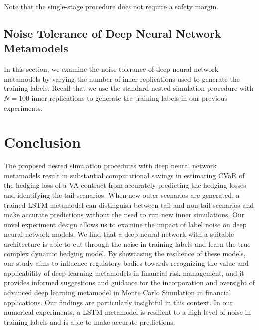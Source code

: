 \documentclass{article}
\begin{document}
Note that the single-stage procedure does not require a safety margin.

\subsection{Noise Tolerance of Deep Neural Network Metamodels}

In this section, we examine the noise tolerance of deep neural network metamodels by varying the number of inner replications used to generate the training labels. 
Recall that we use the standard nested simulation procedure with $N=100$ inner replications to generate the training labels in our previous experiments.

\section{Conclusion} \label{sec:conclusion}
The proposed nested simulation procedures with deep neural network metamodels result in substantial computational savings in estimating CVaR of the hedging loss of a VA contract from accurately predicting the hedging losses and identifying the tail scenarios.
When new outer scenarios are generated, a trained LSTM metamodel can distinguish between tail and non-tail scenarios and make accurate predictions without the need to run new inner simulations.
Our novel experiment design allows us to examine the impact of label noise on deep neural network models.
We find that a deep neural network with a suitable architecture is able to cut through the noise in training labels and learn the true complex dynamic hedging model.
By showcasing the resilience of these models, our study aims to influence regulatory bodies towards recognizing the value and applicability of deep learning metamodels in financial risk management, and it provides informed suggestions and guidance for the incorporation and oversight of advanced deep learning metamodel in Monte Carlo Simulation in financial applications.
Our findings are particularly insightful in this context.
In our numerical experiments, a LSTM metamodel is resilient to a high level of noise in training labels and is able to make accurate predictions. 


\newpage

\footnotesize

\end{document}
